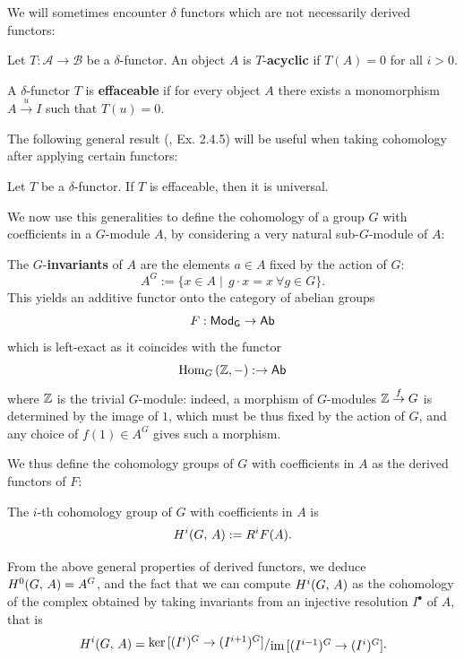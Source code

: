 \documentclass[a4paper, oneside]{memoir}
\begin{document}
We will sometimes encounter $\delta$ functors which are not necessarily derived functors:
\begin{definition}
	Let $T:\mathcal{A}\to\mathcal{B}$ be a $\delta$-functor. An object $A$ is $T$-\textbf{acyclic} if $T(A)=0$ for all $i>0$.
\end{definition}

\begin{definition}
	A $\delta$-functor $T$ is \textbf{effaceable} if for every object $A$ there exists a monomorphism $A\overset{u}{\to} I$ such that $T(u)=0$.
\end{definition}

The following general result (\cite{Tohoku}, Ex. 2.4.5) will be useful when taking cohomology after applying certain functors:

\begin{proposition}\label{prop:Effaceable}
	Let $T$ be a $\delta$-functor. If $T$ is effaceable, then it is universal.
\end{proposition}

We now use this generalities to define the cohomology of a group $G$ with coefficients in a $G$-module $A$, by considering a very natural sub-$G$-module of $A$:

\begin{definition}
	The $G$-\textbf{invariants} of $A$ are the elements $a \in A$ fixed by the action of $G$:
	\[
		A^G:=\{x\in A\mid\, g\cdot x=x ~ \forall g\in G\}.
	\]
	This yields an additive functor onto the category of abelian groups
	\[
		F:\mathsf{Mod}_\mathsf{G}\to\mathsf{Ab}
	\]
	which is left-exact as it coincides with the functor
	\[
		\operatorname{Hom}_G{(\mathbb{Z},-)}:\to\mathsf{Ab}
	\]
	where $\mathbb{Z}$ is the trivial $G$-module: indeed, a morphism of $G$-modules $\mathbb{Z}\overset{f}\to G$ is determined by the image of $1$, which must be thus fixed by the action of $G$, and any choice of $f(1)\in A^G$ gives such a morphism.
\end{definition}

We thus define the cohomology groups of $G$ with coefficients in $A$ as the derived functors of $F$:

\begin{definition}
	The $i$-th cohomology group of $G$ with coefficients in $A$ is
	\[
		H^{i}( G, \, A ):=R^iF(A).
	\]
\end{definition}
From the above general properties of derived functors, we deduce $H^{0}( G, \, A )=A^G$, and the fact that we can compute $H^{i}( G, \, A )$ as the cohomology of the complex obtained by taking  invariants from an injective resolution $I^\bullet$ of $A$, that is
\[
	\H{i}{G}{A}=\ssfrac{\ker{[(I^i)^G\to (I^{i+1})^G]}}{\Im{[(I^{i-1})^G\to (I^i)^G]}}.
\]
\end{document}
